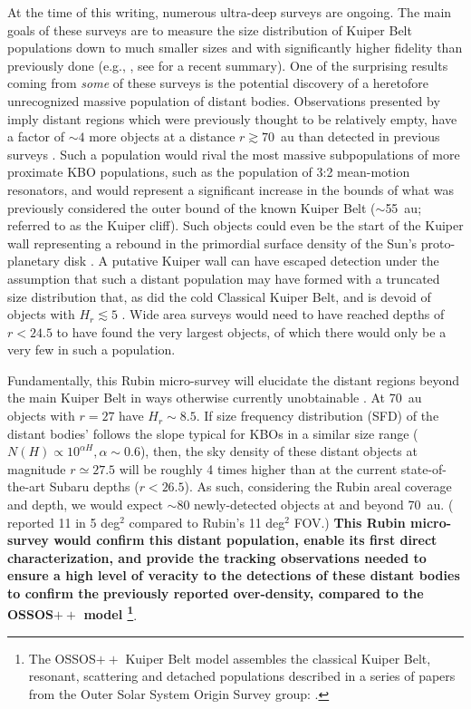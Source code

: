 \documentclass[modern,linenumbers,trackchanges,preprint]{aastex631}
\begin{document}
At the time of this writing, numerous ultra-deep surveys are ongoing. The main goals of these surveys are to measure the size distribution of Kuiper Belt populations down to much smaller sizes and with significantly higher fidelity than previously done (e.g., \citet{Smotherman2024}, see \citet{Lawler24} for a recent summary). 
One of the surprising results coming from \emph{some} of these surveys is the potential discovery of a heretofore unrecognized massive population of distant bodies. 
Observations presented by \citet{Fraser2024PSJ} imply distant regions which were previously thought to be relatively empty, have a factor of $\sim4$ more objects at a distance $r\gtrsim70$~au than detected in previous surveys \citep{Bannister2018}. 
Such a population would rival the most massive subpopulations of more proximate KBO populations, such as the population of 3:2 mean-motion resonators, and would represent a significant increase in the bounds of what was previously considered the outer bound of the known Kuiper Belt ($\sim$55~au;  referred to as the Kuiper cliff). Such objects could even be the start of the Kuiper wall representing a rebound in the primordial surface density of the Sun's proto-planetary disk \citep{Chiang1999}.
A putative Kuiper wall can have escaped detection under the assumption that such a distant population may have formed with a truncated size distribution that, as did the cold Classical Kuiper Belt, and is devoid of objects with $H_r \lesssim 5$ \citep{Gladman2022, Peltier2022}.
Wide area surveys would need to have reached depths of  $r<24.5$ to have found the very largest objects, of which there would only be a very few in such a population. 

Fundamentally, this Rubin micro-survey will elucidate the distant regions beyond the main Kuiper Belt in ways otherwise currently unobtainable \citep{Kavelaars2020}. 
At 70~au objects with $r=27$ have $H_r \sim 8.5$.
If size frequency distribution (SFD) of the distant bodies' follows the slope typical for KBOs in a similar size range ($N(H) \propto 10^{\alpha H}, \alpha\sim0.6$), 
then, the sky density of these distant objects at magnitude $r\simeq27.5$ will be roughly 4 times higher than at the current state-of-the-art Subaru depths ($r<26.5$). 
As such, considering the Rubin areal coverage and depth, we would expect $\sim$80 newly-detected objects at and beyond 70~au. 
(\citet{Fraser2024PSJ} reported 11 in 5 deg$^2$ compared to Rubin's 11 deg$^2$ FOV.) 
{\bf This Rubin micro-survey would confirm this distant population, enable its first direct characterization, and
provide the tracking observations needed to ensure a high level of veracity to the detections of these distant bodies to confirm the previously reported over-density, compared to the OSSOS$++$ model \citep{Petit2023DPS}\footnote{The OSSOS$++$ Kuiper Belt model assembles the classical Kuiper Belt, resonant, scattering and detached populations described in a series of papers from the Outer Solar System Origin Survey group: \citet{Bannister2018, Lawler2018, Kavelaars2021, Crompvoets2022, Petit2023, beaudoin2023}.}}. 
\end{document}
